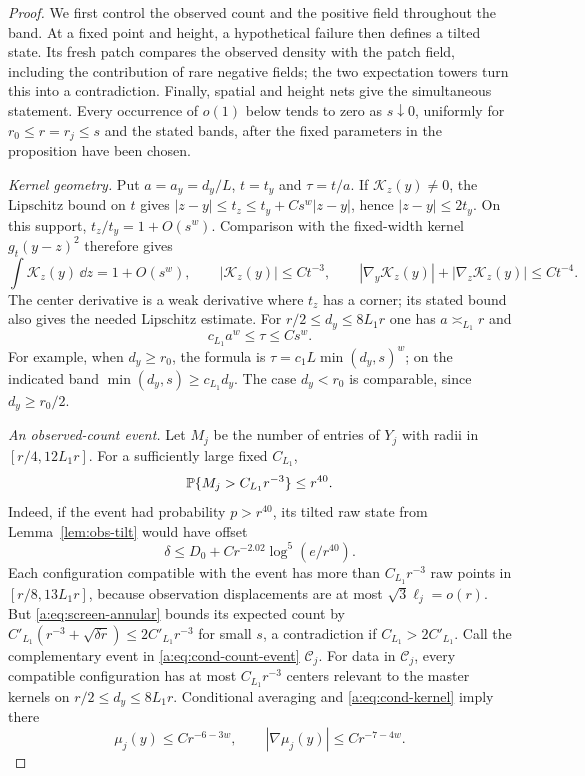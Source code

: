 \begin{proof}
We first control the observed count and the positive field throughout
the band. At a fixed point and height, a hypothetical failure then
defines a tilted state. Its fresh patch compares the observed density
with the patch field, including the contribution of rare negative
fields; the two expectation towers turn this into a contradiction.
Finally, spatial and height nets give the simultaneous statement.
Every occurrence of $o(1)$ below tends to zero as $s\downarrow0$,
uniformly for $r_0\le r=r_j\le s$ and the stated bands, after the
fixed parameters in the proposition have been chosen.

\emph{Kernel geometry.}
Put $a=a_y=d_y/L$, $t=t_y$ and $\tau=t/a$.
If $\mathcal K_z(y)\ne0$, the Lipschitz bound on $t$ gives
$|z-y|\le t_z\le t_y+Cs^w|z-y|$, hence $|z-y|\le2t_y$.
On this support, $t_z/t_y=1+O(s^w)$. Comparison with the fixed-width
kernel $g_t(y-z)^2$ therefore gives
\begin{equation}\label{a:eq:cond-kernel}
 \int\mathcal K_z(y)\,\dd z=1+O(s^w),\qquad
 |\mathcal K_z(y)|\le Ct^{-3},\qquad
 |\nabla_y\mathcal K_z(y)|+|\nabla_z\mathcal K_z(y)|\le Ct^{-4}.
\end{equation}
The center derivative is a weak derivative where $t_z$ has a
corner; its stated bound also gives the needed Lipschitz estimate.
For $r/2\le d_y\le8L_1r$ one has $a\asymp_{L_1}r$ and
\begin{equation}\label{a:eq:cond-tau}
 c_{L_1}a^w\le\tau\le Cs^w.
\end{equation}
For example, when $d_y\ge r_0$, the formula is
$\tau=c_1L\min(d_y,s)^w$; on the indicated band
$\min(d_y,s)\ge c_{L_1}d_y$. The case $d_y<r_0$ is comparable,
since $d_y\ge r_0/2$.

\emph{An observed-count event.}
Let $M_j$ be the number of entries of $Y_j$ with radii in
$[r/4,12L_1r]$. For a sufficiently large fixed $C_{L_1}$,
\begin{equation}\label{a:eq:cond-count-event}
 \mathbb P\{M_j>C_{L_1}r^{-3}\}\le r^{40}.
\end{equation}
Indeed, if the event had probability $p>r^{40}$, its tilted raw
state from Lemma~\ref{lem:obs-tilt} would have offset
\[
 \delta\le D_0+Cr^{-2.02}\log^5(e/r^{40}).
\]
Each configuration compatible with the event has more than
$C_{L_1}r^{-3}$ raw points in $[r/8,13L_1r]$, because observation
displacements are at most $\sqrt3\ell_j=o(r)$. But
\eqref{a:eq:screen-annular} bounds its expected count by
$C'_{L_1}(r^{-3}+\sqrt{\delta r})\le2C'_{L_1}r^{-3}$ for small
$s$, a contradiction if $C_{L_1}>2C'_{L_1}$. Call the complementary
event in \eqref{a:eq:cond-count-event} $\mathcal C_j$.
For data in $\mathcal C_j$, every compatible configuration has at
most $C_{L_1}r^{-3}$ centers relevant to the master kernels on
$r/2\le d_y\le8L_1r$. Conditional averaging and
\eqref{a:eq:cond-kernel} imply there
\begin{equation}\label{a:eq:cond-count-regularity}
 \mu_j(y)\le Cr^{-6-3w},\qquad
 |\nabla\mu_j(y)|\le Cr^{-7-4w}.
\end{equation}


\end{proof}
